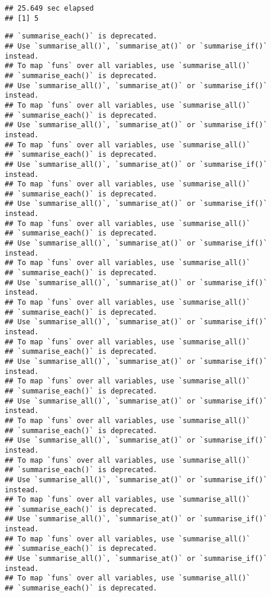\documentclass[]{article}
\begin{document}
\begin{verbatim}
## 25.649 sec elapsed
## [1] 5
\end{verbatim}

\begin{verbatim}
## `summarise_each()` is deprecated.
## Use `summarise_all()`, `summarise_at()` or `summarise_if()` instead.
## To map `funs` over all variables, use `summarise_all()`
## `summarise_each()` is deprecated.
## Use `summarise_all()`, `summarise_at()` or `summarise_if()` instead.
## To map `funs` over all variables, use `summarise_all()`
## `summarise_each()` is deprecated.
## Use `summarise_all()`, `summarise_at()` or `summarise_if()` instead.
## To map `funs` over all variables, use `summarise_all()`
## `summarise_each()` is deprecated.
## Use `summarise_all()`, `summarise_at()` or `summarise_if()` instead.
## To map `funs` over all variables, use `summarise_all()`
## `summarise_each()` is deprecated.
## Use `summarise_all()`, `summarise_at()` or `summarise_if()` instead.
## To map `funs` over all variables, use `summarise_all()`
## `summarise_each()` is deprecated.
## Use `summarise_all()`, `summarise_at()` or `summarise_if()` instead.
## To map `funs` over all variables, use `summarise_all()`
## `summarise_each()` is deprecated.
## Use `summarise_all()`, `summarise_at()` or `summarise_if()` instead.
## To map `funs` over all variables, use `summarise_all()`
## `summarise_each()` is deprecated.
## Use `summarise_all()`, `summarise_at()` or `summarise_if()` instead.
## To map `funs` over all variables, use `summarise_all()`
## `summarise_each()` is deprecated.
## Use `summarise_all()`, `summarise_at()` or `summarise_if()` instead.
## To map `funs` over all variables, use `summarise_all()`
## `summarise_each()` is deprecated.
## Use `summarise_all()`, `summarise_at()` or `summarise_if()` instead.
## To map `funs` over all variables, use `summarise_all()`
## `summarise_each()` is deprecated.
## Use `summarise_all()`, `summarise_at()` or `summarise_if()` instead.
## To map `funs` over all variables, use `summarise_all()`
## `summarise_each()` is deprecated.
## Use `summarise_all()`, `summarise_at()` or `summarise_if()` instead.
## To map `funs` over all variables, use `summarise_all()`
## `summarise_each()` is deprecated.
## Use `summarise_all()`, `summarise_at()` or `summarise_if()` instead.
## To map `funs` over all variables, use `summarise_all()`
## `summarise_each()` is deprecated.
## Use `summarise_all()`, `summarise_at()` or `summarise_if()` instead.
## To map `funs` over all variables, use `summarise_all()`
## `summarise_each()` is deprecated.

\end{verbatim}
\end{document}
